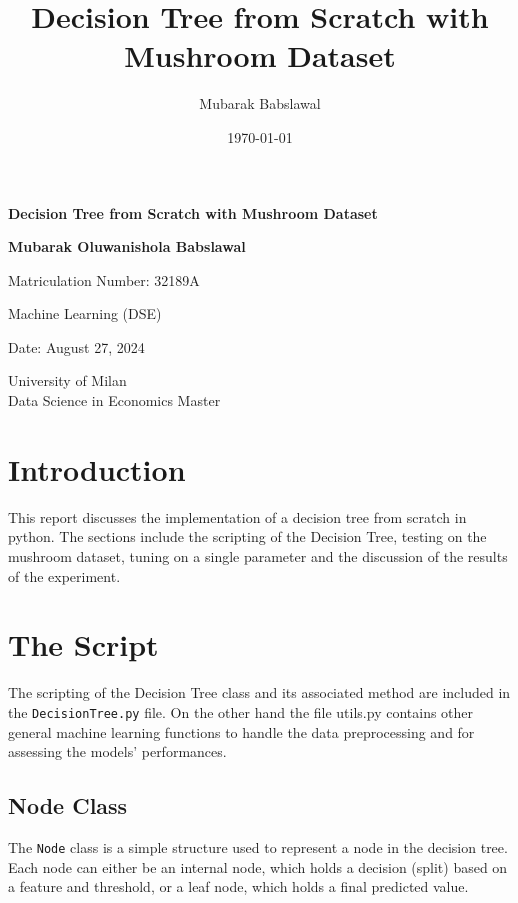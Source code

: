 \documentclass{article}
\title{Decision Tree from Scratch with Mushroom Dataset}
\author{Mubarak Babslawal}
\date{\today}
\begin{document}
\begin{titlepage}
    \centering
    \vspace*{2cm}

    \Huge
    \textbf{Decision Tree from Scratch with Mushroom Dataset}

    \vspace{1.5cm}
    
    \LARGE
    \textbf{Mubarak Oluwanishola Babslawal}
    
    \vspace{0.5cm}
    \Large
    Matriculation Number: 32189A

    \vfill
    
    \Large
    Machine Learning (DSE)
    
    \vspace{0.8cm}
    
    \Large
    Date: August 27, 2024
    
    \vspace{1cm}

    \Large
    University of Milan\\
    Data Science in Economics Master

\end{titlepage}

\section{Introduction}
This report discusses the implementation of a decision tree from scratch in python. The sections include the scripting of the Decision Tree, testing on the mushroom dataset, tuning on a single parameter and the discussion of the results of the experiment.

\section{The Script}
The scripting of the Decision Tree class and its associated method are included in the \texttt{DecisionTree.py} file. On the other hand the file utils.py contains other general machine learning functions to handle the data preprocessing and for assessing the models' performances.

\subsection{Node Class}
The \texttt{Node} class is a simple structure used to represent a node in the decision tree. Each node can either be an internal node, which holds a decision (split) based on a feature and threshold, or a leaf node, which holds a final predicted value.
\end{document}
